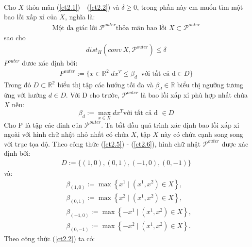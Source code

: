 \documentclass[12pt,a4paper,openany,oneside]{report}
\begin{document}
Cho $X$ thỏa mãn (\ref{ct2.1}) - (\ref{ct2.2}) và $\delta \geq 0$, trong phần này em muốn tìm một bao lồi xấp xỉ của $X$, nghĩa là:
\begin{align}\label{ct2.4}
	\text{Một đa giác lồi }\mathcal{P}^{outer} \text{thỏa mãn bao lồi }X\subset\mathcal{P}^{outer}
\end{align}
sao cho
\begin{align}\label{ct2.5}
	dist_H\left(conv\ X, \mathcal{P}^{outer}\right) \leq \delta
\end{align}
$P^{outer}$ đươc xác định bởi:
\begin{align}\label{ct2.6}
	P^{outer} := \{x\in\mathbb{R}^2 | dx^T \leq \beta_d\ \text{ với tất cả d} \in D\}
\end{align}
Trong đó $D \subset \mathbb{R^2}$ biểu thị tập các hướng tối đa và $\beta_d \in \mathbb{R}$ biểu thị ngưỡng tương ứng với hướng $d \in D$. Với D cho trước, $\mathcal{P}^{outer}$ là bao lồi xấp xỉ phù hợp nhất chứa $X$ nếu:
\begin{equation}\label{ct2.7}
	\beta_d:=\max _{x \in X} d x^T \text{với tất cả d }\in D
\end{equation}
Cho P là tập các đỉnh của $\mathcal{P}^{outer}$.
Ta bắt đầu quá trình xác định bao lồi xấp xỉ ngoài với hình chữ nhật nhỏ nhất có chứa $X$, tập $X$ này có chứa cạnh song song với trục tọa độ. Theo công thức (\ref{ct2.5}) - (\ref{ct2.6}), hình chữ nhật $\mathcal{P}^{outer}$ được xác định bởi:
\begin{align}\label{ct2.8}
	D:=\{(1, 0), (0, 1), (-1, 0), (0, -1)\}
\end{align}
và:
\begin{equation}\label{ct2.9}
	\begin{aligned}
		& \beta_{(1,0)}:=\max \left\{x^1 \mid\left(x^1, x^2\right) \in X\right\}, \\
		& \beta_{(0,1)}:=\max \left\{x^2 \mid\left(x^1, x^2\right) \in X\right\}, \\
		& \beta_{(-1,0)}:=\max \left\{-x^1 \mid\left(x^1, x^2\right) \in X\right\}, \\
		& \beta_{(0,-1)}:=\max \left\{-x^2 \mid\left(x^1, x^2\right) \in X\right\} .
	\end{aligned}
\end{equation}
Theo công thức (\ref{ct2.2}) ta có:
\end{document}
